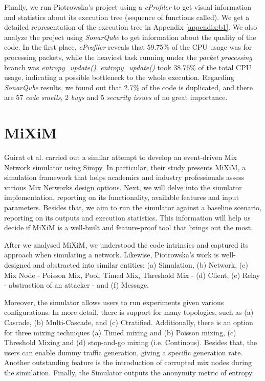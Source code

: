 \documentclass[logo,msc,cyber]{infthesis}   %
\begin{document}
Finally, we run Piotrowska's project using a \emph{cProfiler}\cite{cProfile} to
get visual information and statistics about its execution tree (sequence of
functions called). We get a detailed representation of the execution tree in
Appendix \ref{appendix:b1}. We also analyze the project using \emph{SonarQube}\cite{sonarqube} to
get information about the quality of the code. In the first place,
\emph{cProfiler} reveals that 59.75\% of the CPU usage was for processing
packets, while the heaviest task running under the \emph{packet processing}
branch was \emph{entropy\_update()}. \emph{entropy\_update()} took 38.76\% of
the total CPU usage, indicating a possible bottleneck to the whole execution.
Regarding \emph{SonarQube} results, we found out that 2.7\% of the code is
duplicated, and there are 57 \emph{code smells}, 2 \emph{bugs} and 5
\emph{security issues} of no great importance.

\section{MiXiM}

Guirat et al.\cite{guirat2022mixnet} carried out a similar attempt to develop an
event-driven Mix Network simulator using Simpy\cite{simpy}. In particular,
their study\cite{guirat2022mixnet} presents MiXiM, a simulation framework that
helps academics and industry professionals assess various Mix Networks design
options. Next, we will delve into the simulator implementation, reporting on its
functionality, available features and input parameters. Besides that, we aim to
run the simulator against a baseline scenario, reporting on its outputs and
execution statistics. This information will help us decide if MiXiM is a
well-built and feature-proof tool that brings out the most.

After we analysed  MiXiM, we understood the code intrinsics and captured its
approach when simulating a network. Likewise, Piotrowska's work is well-designed
and abstracted into similar entities: (a) Simulation, (b) Network, (c) Mix Node -
Poisson Mix, Pool, Timed Mix, Threshold Mix - (d) Client, (e) Relay -
abstraction of an attacker - and (f) Message.


Moreover, the simulator allows users to run experiments given various
configurations. In more detail, there is support for many topologies, such as
(a) Cascade, (b) Multi-Cascade, and (c) Ctratified. Additionally, there is an
option for three mixing techniques (a) Timed mixing and (b) Poisson mixing, (c)
Threshold Mixing and (d) stop-and-go mixing\cite{kesdogan1998stop} (i.e.
Continous). Besides that, the users can enable dummy traffic generation, giving
a specific generation rate. Another outstanding feature is the introduction of
corrupted mix nodes during the simulation. Finally, the Simulator outputs the
anonymity metric of entropy.
\end{document}
